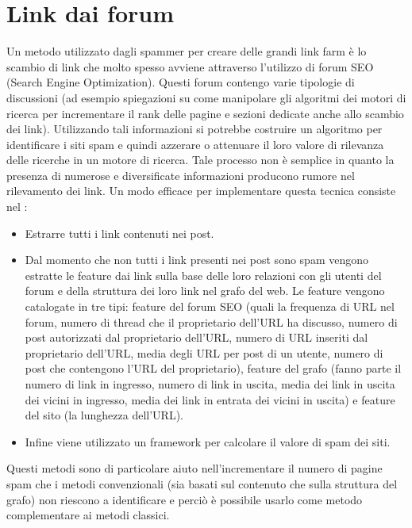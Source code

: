 \section{Link dai forum}
Un metodo utilizzato dagli spammer per creare delle grandi link farm è lo scambio di link che molto spesso avviene attraverso l'utilizzo di forum SEO (Search Engine Optimization). Questi forum contengo varie tipologie di discussioni  (ad esempio spiegazioni su come manipolare gli algoritmi dei motori di ricerca per incrementare il rank delle pagine e sezioni dedicate anche allo scambio dei link). Utilizzando tali informazioni si potrebbe costruire un algoritmo per identificare i siti spam e quindi azzerare o attenuare il loro valore di rilevanza delle ricerche in un motore di ricerca. Tale processo non è semplice in quanto la presenza di numerose e diversificate informazioni producono rumore nel rilevamento dei link. Un modo efficace per implementare questa tecnica consiste nel  \cite{Cheng:2011:LWS:1935826.1935902}: 
\begin{itemize}
 \item Estrarre tutti i link contenuti nei post.
 \item Dal momento che non tutti i link presenti nei post sono spam vengono estratte le feature dai link sulla base delle loro relazioni con gli utenti del forum e della struttura dei loro link nel grafo del web. Le feature vengono catalogate in tre tipi: feature del forum SEO (quali la frequenza di URL nel forum, numero di thread che il proprietario dell'URL ha discusso, numero di post autorizzati dal proprietario dell'URL, numero di URL inseriti dal proprietario dell'URL, media degli URL per post di un utente, numero di post che contengono l'URL del proprietario), feature del grafo (fanno parte il numero di link in ingresso, numero di link in uscita, media dei link in uscita dei vicini in ingresso, media dei link in entrata dei vicini in uscita) e feature del sito (la lunghezza dell'URL). 
 \item Infine viene utilizzato un framework per calcolare il valore di spam dei siti.
\end{itemize}
Questi metodi sono di particolare aiuto nell'incrementare il numero di pagine spam che i metodi convenzionali (sia basati sul contenuto che sulla struttura del grafo) non riescono a identificare  e perciò è possibile usarlo come metodo complementare ai metodi classici. 



